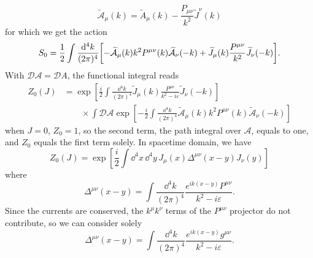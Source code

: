 \begin{equation}
    \widetilde{\mathcal{A}}_\mu(k)=\widetilde{A}_\mu(k)-\frac{P_{\mu\nu}}{k^2}\widetilde{J}^\nu(k)
\end{equation}
for which we get the action
\begin{equation}
    S_0=\frac{1}{2}\int\frac{\dd^4 k}{(2\pi)^4}\qty[-\widetilde{\mathcal{A}}_\mu(k)k^2P^{\mu\nu}(k)\widetilde{\mathcal{A}}_\nu(-k)+\widetilde{J}_\mu(k)\frac{P^{\mu\nu}}{k^2}\widetilde{J}_\nu(-k)].
\end{equation}
 With $\mathcal{DA}=\mathcal{D}A$, the functional integral reads
\begin{equation}
\begin{aligned}
    Z_0(J)&=\exp[\frac{i}{2}\int\frac{\dd^4 k}{(2\pi)^4}\widetilde{J}_\mu(k)\frac{P^{\mu\nu}}{k^2-i\varepsilon}\widetilde{J}_\nu(-k)]\\
    &\qquad\times\int\mathcal{DA}\exp[-\frac{i}{2}\int\frac{\dd^4 k}{(2\pi)^4}\widetilde{\mathcal{A}}_\mu(k)k^2P^{\mu\nu}(k)\widetilde{\mathcal{A}}_\nu(-k)]
\end{aligned}
\end{equation}
when $J=0$, $Z_0=1$, so the second term, the path integral over $\mathcal{A}$, equals to one, and $Z_0$ equals the first term solely. In spacetime domain, we have
\begin{equation}
    Z_0(J)=\exp[\frac{i}{2}\int\dd^4x \,\dd^4 y\, J_\mu(x)\Delta^{\mu\nu}(x-y)J_\nu(y)]
    \label{Z_0_photon}
\end{equation}
where 
\begin{equation}
    \Delta^{\mu\nu}(x-y)=\int\frac{\dd^4k}{(2\pi)^4}\frac{e^{ik(x-y)}P^{\mu\nu}}{k^2-i\varepsilon}.
\end{equation}
Since the currents are conserved, the $k^\mu k^\nu$ terms of the $P^{\mu\nu}$ projector do not contribute, so we can consider solely
\begin{equation}
    \Delta^{\mu\nu}(x-y)=\int\frac{\dd^4k}{(2\pi)^4}\frac{e^{ik(x-y)}g^{\mu\nu}}{k^2-i\varepsilon}.
\end{equation}
